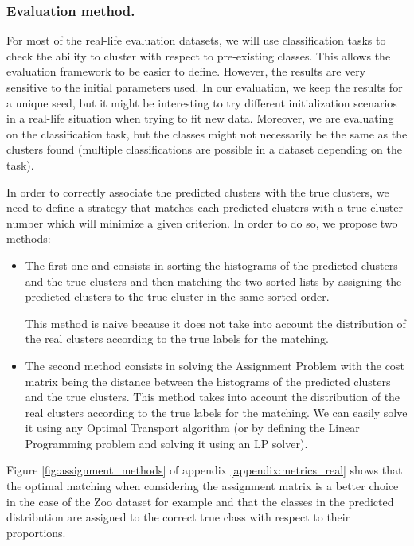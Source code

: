 \subsubsection{Evaluation method.} \label{sec:evaluation_method}
For most of the real-life evaluation datasets, we will use classification tasks to check the ability to cluster with respect to pre-existing classes. This allows the evaluation framework to be easier to define. However, the results are very sensitive to the initial parameters used. In our evaluation, we keep the results for a unique seed, but it might be interesting to try different initialization scenarios in a real-life situation when trying to fit new data. 
Moreover, we are evaluating on the classification task, but the classes might not necessarily be the same as the clusters found (multiple classifications are possible in a dataset depending on the task).

In order to correctly associate the predicted clusters with the true clusters, we need to define a strategy that matches each predicted clusters with a true cluster number which will minimize a given criterion.
In order to do so, we propose two methods:
\begin{itemize}
    \item The first one and consists in sorting the histograms of the predicted clusters and the true clusters and then matching the two sorted lists by assigning the predicted clusters to the true cluster in the same sorted order.
    
    This method is naive because it does not take into account the distribution of the real clusters according to the true labels for the matching.
    
\item The second method consists in solving the Assignment Problem \citep{kuhn1955hungarian} with the cost matrix being the distance between the histograms of the predicted clusters and the true clusters. This method takes into account the distribution of the real clusters according to the true labels for the matching. We can easily solve it using any Optimal Transport algorithm (or by defining the Linear Programming problem and solving it using an LP solver).
\end{itemize}
Figure \ref{fig:assignment_methods} of appendix \ref{appendix:metrics_real} shows that the optimal matching when considering the assignment matrix is a better choice in the case of the Zoo dataset for example and that the classes in the predicted distribution are assigned to the correct true class with respect to their proportions.


